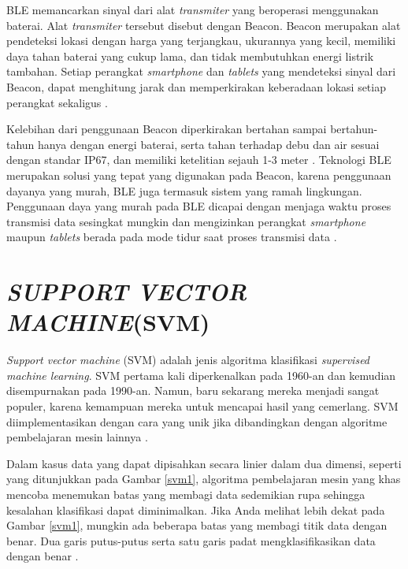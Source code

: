 \par BLE memancarkan sinyal dari alat \textit{transmiter} yang beroperasi menggunakan baterai. Alat \textit{transmiter} tersebut disebut dengan Beacon. Beacon merupakan alat pendeteksi lokasi dengan harga yang terjangkau, ukurannya yang kecil, memiliki daya tahan baterai yang cukup lama, dan tidak membutuhkan energi listrik tambahan. Setiap perangkat \textit{smartphone} dan \textit{tablets} yang mendeteksi sinyal dari Beacon, dapat menghitung jarak dan memperkirakan keberadaan lokasi setiap perangkat sekaligus \citep{Keluza2017}.

\par Kelebihan dari penggunaan Beacon diperkirakan bertahan sampai bertahun-tahun hanya dengan energi baterai, serta tahan terhadap debu dan air sesuai dengan standar IP67, dan memiliki ketelitian sejauh 1-3 meter \citep{Insoft2016}. Teknologi BLE merupakan solusi yang tepat yang digunakan pada Beacon, karena penggunaan dayanya yang murah, BLE juga termasuk sistem yang ramah lingkungan. Penggunaan daya yang murah pada BLE dicapai dengan menjaga waktu proses transmisi data sesingkat mungkin dan mengizinkan perangkat \textit{smartphone} maupun \textit{tablets} berada pada mode tidur saat proses transmisi data \citep{Feng2011}.

\section{\uppercase{\textit{SUPPORT VECTOR MACHINE}(SVM)}}
\textit{Support vector machine} (SVM) adalah jenis algoritma klasifikasi \textit{supervised machine learning}. SVM pertama kali diperkenalkan pada 1960-an dan kemudian disempurnakan pada 1990-an. Namun, baru sekarang mereka menjadi sangat populer, karena kemampuan mereka untuk mencapai hasil yang cemerlang. SVM diimplementasikan dengan cara yang unik jika dibandingkan dengan algoritme pembelajaran mesin lainnya \citep{Campbell2010}.

\par Dalam kasus data yang dapat dipisahkan secara linier dalam dua dimensi, seperti yang ditunjukkan pada Gambar \ref{svm1}, algoritma pembelajaran mesin yang khas mencoba menemukan batas yang membagi data sedemikian rupa sehingga kesalahan klasifikasi dapat diminimalkan. Jika Anda melihat lebih dekat pada Gambar \ref{svm1}, mungkin ada beberapa batas yang membagi titik data dengan benar. Dua garis putus-putus serta satu garis padat mengklasifikasikan data dengan benar \citep{Zhibin2008}.

